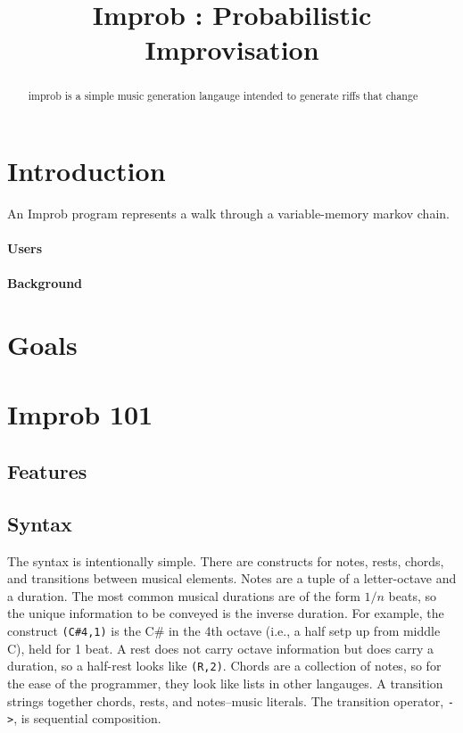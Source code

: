 \documentclass[pldi]{sigplanconf-pldi15}
\begin{document}
%
%

\title{Improb : Probabilistic Improvisation}

\maketitle
\begin{abstract}
improb is a simple music generation langauge
intended to generate riffs that change

\end{abstract}

\section{Introduction}
An Improb program represents a walk through a variable-memory markov chain.

\paragraph{Users}

\paragraph{Background}

\section{Goals}

\section{Improb 101}

\subsection{Features}

\subsection{Syntax}
The syntax is intentionally simple. There are constructs for notes, rests, chords, and transitions between musical elements. Notes are a tuple of a letter-octave and a duration. The most common musical durations are of the form $1/n$ beats, so the unique information to be conveyed is the inverse duration. For example, the construct \texttt{(C\#4,1)} is the C\# in the 4th octave (i.e., a half setp up from middle C), held for 1 beat.
A rest does not carry octave information but does carry a duration, so a half-rest looks like \texttt{(R,2)}.
Chords are a collection of notes, so for the ease of the programmer, they look like lists in other langauges.
A transition strings together chords, rests, and notes--music literals. The transition operator, \texttt{->}, is sequential composition.
\end{document}
